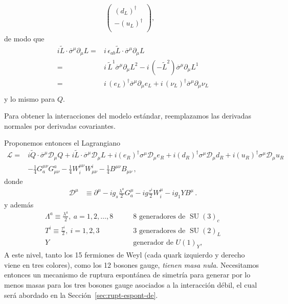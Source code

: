 \begin{frame}
\begin{align}
\begin{pmatrix}
   \left(d_L\right)^{\dagger}\\
  - \left(u_L  \right)^{\dagger}\\
  \end{pmatrix},&
\end{align}
de modo que
\begin{align*}
  i\widetilde{L}\cdot\overline{\sigma}^{\mu}\partial_{\mu}L=&
  i\,\epsilon_{ab}\widetilde{L}\cdot\overline{\sigma}^{\mu}\partial_{\mu}L \nonumber\\
 =&i\,\widetilde{L}^1\overline{\sigma}^{\mu}\partial_{\mu}L^2-i\,\left( -\widetilde{L}^2 \right)\overline{\sigma}^{\mu}\partial_{\mu}L^1    \nonumber\\
 =&i\,\left( e_L \right)^{\dagger}\overline{\sigma}^{\mu}\partial_{\mu}e_L+i\,\left( \nu_L \right)^{\dagger}\overline{\sigma}^{\mu}\partial_{\mu}\nu_L    \nonumber\\
\end{align*}
y lo mismo para $Q$.



Para obtener la interacciones del modelo estándar, reemplazamos las derivadas normales por derivadas covariantes.

Proponemos entonces el Lagrangiano
\begin{align}
\label{eq:L0}
     \mathcal{L}=&i\widetilde{Q}\cdot \overline{\sigma}^\mu\mathcal{D}_\mu Q+i\widetilde{L}\cdot \overline{\sigma}^\mu\mathcal{D}_\mu L+
i(e_R)^{\dagger}\sigma^\mu\mathcal{D}_\mu {e_R}+i(d_R)^{\dagger}\sigma^\mu\mathcal{D}_\mu d_R+i(u_R)^{\dagger}\sigma^\mu\mathcal{D}_\mu {u_R}
\nonumber\\
     &-\tfrac{1}{4}G^{\mu\nu}_a G_{\mu\nu}^a-\tfrac{1}{4}W^{\mu\nu}_i W_{\mu\nu}^i-\tfrac{1}{4}B^{\mu\nu} B_{\mu\nu}\,,
\end{align}
donde
\begin{align}
  \mathcal{D}^\mu&\equiv\partial^\mu-i g_s\frac{\lambda^a}{2}G^\mu_a-i g \frac{\tau^i}{2}W^\mu_i-i {g_1}YB^\mu\,.
\end{align}
y además
\begin{align*}
  \Lambda^a\equiv\frac{\lambda^a}{2},\ a=1,2,\ldots,8 &\qquad\text{8 generadores de $\operatorname{SU}(3)_c$}\\
  T^i\equiv\frac{\tau^i}{2},\ i=1,2,3 &\qquad\text{3 generadores de $\operatorname{SU}(2)_L$}\\
  Y &\qquad\text{generador de $U(1)_Y$},
\end{align*}
A este nivel, tanto los 15 fermiones de Weyl (cada quark izquierdo y derecho viene en tres colores), como los 12 bosones gauge, \emph{tienen masa nula}. Necesitamos entonces un mecanismo de ruptura espontánea de simetría para generar por lo menos masas para los tres bosones gauge asociados a la interacción débil, el cual será abordado en la Sección~\ref{sec:rupt-espont-de}.



\end{frame}
